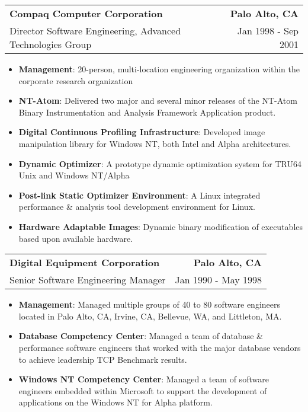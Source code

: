 \documentclass[letterpaper,11pt]{article}
\makeatletter
\newcommand{\resumeSubheading}[4]{
    \item
    \begin{tabular*}{1.0\textwidth}[t]{l@{\extracolsep{\fill}}r}
      \textbf{#1} & \textbf{#2} \\
      {#3} & {#4}
    \end{tabular*}\vspace{-5pt}
  }
\newcommand{\resumeItem}[2]{\item{{\textbf{\small#1}}: {\small#2 \vspace{-1pt}}}}
\newcommand{\resumeItemListStart}{\begin{itemize}}
\newcommand{\resumeItemListEnd}{\end{itemize}}\vspace{-10pt}
\makeatother
\begin{document}
          \resumeSubheading
            {Compaq Computer Corporation}{Palo Alto, CA}
            {Director Software Engineering, Advanced Technologies Group}{Jan 1998 - Sep 2001}
            \resumeItemListStart
                \resumeItem{Management}{20-person, multi-location engineering organization within the corporate research organization}
                \resumeItem{NT-Atom}{Delivered two major and several minor releases of the NT-Atom Binary Instrumentation
                        and Analysis Framework Application product.}
                \resumeItem{Digital Continuous Profiling Infrastructure}{Developed image manipulation library for Windows NT, both Intel and Alpha architectures.}
                \resumeItem{Dynamic Optimizer}{A prototype dynamic optimization system for TRU64 Unix and Windows NT/Alpha}
                \resumeItem{Post-link Static Optimizer Environment}{A Linux integrated performance \& analysis tool development environment for Linux.}
                \resumeItem{Hardware Adaptable Images}{Dynamic binary modification of executables based upon available hardware.}
            \resumeItemListEnd

        \resumeSubheading
          {Digital Equipment Corporation}{Palo Alto, CA}
          {Senior Software Engineering Manager }{Jan 1990 - May 1998}
               \resumeItemListStart
               \resumeItem{Management}{Managed multiple groups of 40 to 80 software engineers located in Palo Alto, CA, Irvine, CA, Bellevue, WA, and Littleton, MA.}
               \resumeItem{Database Competency Center}{Managed a team of database \& performance software engineers that worked with 
                            the major database vendors to achieve leadership TCP Benchmark results.}
                \resumeItem{Windows NT Competency Center}{Managed a team of software engineers embedded within Microsoft to support the development of applications
                            on the Windows NT for Alpha platform.}
            \resumeItemListEnd
\end{document}

